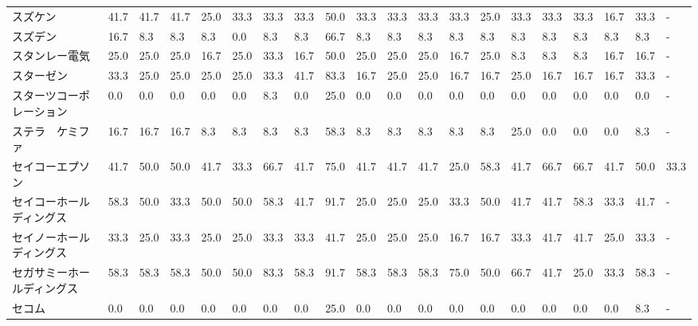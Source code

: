 \documentclass[a4paper，11pt]{jsarticle}
\begin{document}
\begin{longtable}[c]{lp{3mm}p{3mm}p{3mm}p{3mm}p{3mm}p{3mm}p{3mm}p{3mm}p{3mm}p{3mm}p{3mm}p{3mm}p{3mm}p{3mm}p{3mm}p{3mm}p{3mm}p{3mm}p{3mm}}
スズケン            &   41.7 &   41.7 &      41.7 &      25.0 &       33.3 &   33.3 &   33.3 &   50.0 &    33.3 &    33.3 &   33.3 &  33.3 &   25.0 &    33.3 &    33.3 &  33.3 &  16.7 &  33.3 &     - \\
スズデン            &   16.7 &    8.3 &       8.3 &       8.3 &        0.0 &    8.3 &    8.3 &   66.7 &     8.3 &     8.3 &    8.3 &   8.3 &    8.3 &     8.3 &     8.3 &   8.3 &   8.3 &   8.3 &     - \\
スタンレー電気         &   25.0 &   25.0 &      25.0 &      16.7 &       25.0 &   33.3 &   16.7 &   50.0 &    25.0 &    25.0 &   25.0 &  16.7 &   25.0 &     8.3 &     8.3 &   8.3 &  16.7 &  16.7 &     - \\
スターゼン           &   33.3 &   25.0 &      25.0 &      25.0 &       25.0 &   33.3 &   41.7 &   83.3 &    16.7 &    25.0 &   25.0 &  16.7 &   16.7 &    25.0 &    16.7 &  16.7 &  16.7 &  33.3 &     - \\
スターツコーポレーション    &    0.0 &    0.0 &       0.0 &       0.0 &        0.0 &    8.3 &    0.0 &   25.0 &     0.0 &     0.0 &    0.0 &   0.0 &    0.0 &     0.0 &     0.0 &   0.0 &   0.0 &   0.0 &     - \\
ステラ　ケミファ        &   16.7 &   16.7 &      16.7 &       8.3 &        8.3 &    8.3 &    8.3 &   58.3 &     8.3 &     8.3 &    8.3 &   8.3 &    8.3 &    25.0 &     0.0 &   0.0 &   0.0 &   8.3 &     - \\
セイコーエプソン        &   41.7 &   50.0 &      50.0 &      41.7 &       33.3 &   66.7 &   41.7 &   75.0 &    41.7 &    41.7 &   41.7 &  25.0 &   58.3 &    41.7 &    66.7 &  66.7 &  41.7 &  50.0 &  33.3 \\
セイコーホールディングス    &   58.3 &   50.0 &      33.3 &      50.0 &       50.0 &   58.3 &   41.7 &   91.7 &    25.0 &    25.0 &   25.0 &  33.3 &   50.0 &    41.7 &    41.7 &  58.3 &  33.3 &  41.7 &     - \\
セイノーホールディングス    &   33.3 &   25.0 &      33.3 &      25.0 &       25.0 &   33.3 &   33.3 &   41.7 &    25.0 &    25.0 &   25.0 &  16.7 &   16.7 &    33.3 &    41.7 &  41.7 &  25.0 &  33.3 &     - \\
セガサミーホールディングス   &   58.3 &   58.3 &      58.3 &      50.0 &       50.0 &   83.3 &   58.3 &   91.7 &    58.3 &    58.3 &   58.3 &  75.0 &   50.0 &    66.7 &    41.7 &  25.0 &  33.3 &  58.3 &     - \\
セコム             &    0.0 &    0.0 &       0.0 &       0.0 &        0.0 &    0.0 &    0.0 &   25.0 &     0.0 &     0.0 &    0.0 &   0.0 &    0.0 &     0.0 &     0.0 &   0.0 &   0.0 &   8.3 &     - \\

\end{longtable}
\end{document}
